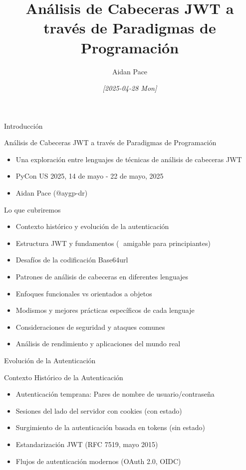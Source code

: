 \documentclass[presentation,aspectratio=169]{beamer}
\author{Aidan Pace}
\date{\textit{{[}2025-04-28 Mon]}}
\title{Análisis de Cabeceras JWT a través de Paradigmas de Programación}
\begin{document}
\maketitle
\begin{frame}[label={sec:org59842cd}]{Introducción}
\begin{block}{Análisis de Cabeceras JWT a través de Paradigmas de Programación}
\begin{itemize}[<+->]
\item Una exploración entre lenguajes de técnicas de análisis de cabeceras JWT
\item PyCon US 2025, 14 de mayo - 22 de mayo, 2025
\item Aidan Pace (@aygp-dr)
\end{itemize}
\end{block}
\begin{block}{Lo que cubriremos}
\begin{itemize}[<+->]
\item Contexto histórico y evolución de la autenticación
\item Estructura JWT y fundamentos (🔰 amigable para principiantes)
\item Desafíos de la codificación Base64url
\item Patrones de análisis de cabeceras en diferentes lenguajes
\item Enfoques funcionales vs orientados a objetos
\item Modismos y mejores prácticas específicos de cada lenguaje
\item Consideraciones de seguridad y ataques comunes
\item Análisis de rendimiento y aplicaciones del mundo real
\end{itemize}
\end{block}
\end{frame}
\begin{frame}[label={sec:org30143c7}]{Evolución de la Autenticación}
\begin{block}{Contexto Histórico de la Autenticación}
\begin{itemize}[<+->]
\item Autenticación temprana: Pares de nombre de usuario/contraseña
\item Sesiones del lado del servidor con cookies (con estado)
\item Surgimiento de la autenticación basada en tokens (sin estado)
\item Estandarización JWT (RFC 7519, mayo 2015)
\item Flujos de autenticación modernos (OAuth 2.0, OIDC)
\end{itemize}
\end{block}
\end{frame}
\end{document}
